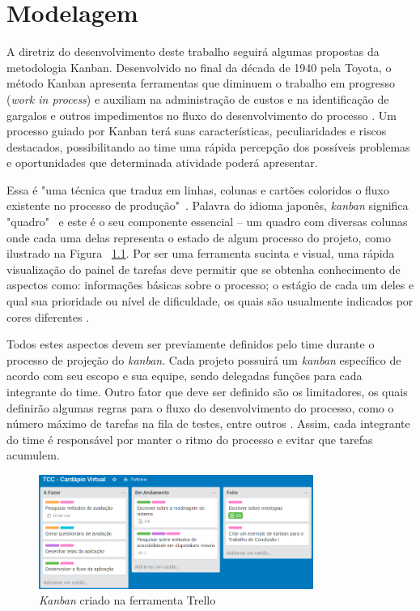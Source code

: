 \chapter{\label{chap:modelagem}Modelagem}
A diretriz do desenvolvimento deste trabalho seguirá algumas propostas da metodologia Kanban. Desenvolvido no final da década de 1940 pela Toyota, o método Kanban apresenta ferramentas que diminuem o trabalho em progresso (\textit{work in process}) e  auxiliam na administração de custos e na identificação de gargalos e outros impedimentos no fluxo do desenvolvimento do processo \cite{GROSS2003}. Um processo guiado por Kanban terá suas características, peculiaridades e riscos destacados, possibilitando ao time uma rápida percepção dos possíveis problemas e oportunidades que determinada atividade poderá apresentar.

Essa é "uma técnica que traduz em linhas, colunas e cartões coloridos o fluxo existente no processo de produção"\ \cite{AUDY2015}. Palavra do idioma japonês, \textit{kanban} significa "quadro"\ \cite{GROSS2003} e este é o seu componente essencial -- um quadro com diversas colunas onde cada uma delas representa o estado de algum processo do projeto, como ilustrado na Figura ~\ref{fig:kanban1}. Por ser uma ferramenta sucinta e visual, uma rápida visualização do painel de tarefas deve permitir que se obtenha conhecimento de aspectos como: informações básicas sobre o processo; o estágio de cada um deles e qual sua prioridade ou nível de dificuldade, os quais são usualmente indicados por cores diferentes \cite{AUDY2015}. 

Todos estes aspectos devem ser previamente definidos pelo time durante o processo de projeção do \textit{kanban}. Cada projeto possuirá um \textit{kanban} específico de acordo com seu escopo e sua equipe, sendo delegadas funções para cada integrante do time. Outro fator que deve ser definido são os limitadores, os quais definirão algumas regras para o fluxo do desenvolvimento do processo, como o número máximo de tarefas na fila de testes, entre outros \cite{AUDY2015}. Assim, cada integrante do time é responsável por manter o ritmo do processo e evitar que tarefas acumulem.

\begin{figure}[htb]
\centering
\caption[\emph{Kanban}]{\label{fig:kanban1}\emph{Kanban} criado na ferramenta Trello}
\includegraphics[width=0.8\textwidth]{fig/kanban1.png}
\end{figure}


